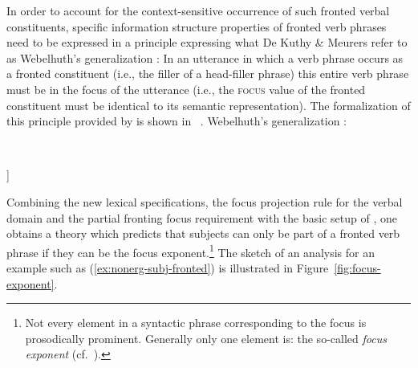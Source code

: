 \documentclass[output=paper
                ,modfonts
                ,nonflat
	        ,collection
	        ,collectionchapter
	        ,collectiontoclongg
 	        ,biblatex
                ,babelshorthands
                ,newtxmath
                ,draftmode
                ,colorlinks, citecolor=brown
]{./langsci/langscibook}
\begin{document}
In order to account for the context-sensitive occurrence of such
fronted verbal constituents, specific information structure properties
of fronted verb phrases need to be expressed in a principle expressing
what De Kuthy \& Meurers refer to as Webelhuth's generalization \citep[53]{Webelhuth90-ohne-crossref}: In
an utterance in which a verb phrase occurs as a fronted constituent
(i.e., the filler of a head-filler phrase) this entire verb phrase
must be in the focus of the utterance (i.e., the \textsc{focus} value
of the fronted constituent must be identical to its semantic
representation).  The formalization of this principle provided by \citep{dKM2003a} is shown in~ .
\ea
\bigskip
Webelhuth's generalization \citep{dKM2003a}:\\
\begin{flushleft}
\begin{avm}
\end{avm}
\impl\ 
\end{flushleft}
\begin{flushright}
\begin{avm}
  [info-struc|focus <@1>\\
  non-head-dtr  [info-struc|focus & <@1>\\
  synsem|loc|cont|lf & @1]]\qquad
\end{avm}\medskip
\label{fig:webelhuths-generalization}
\end{flushright}\unskip
\z
Combining the new lexical specifications, the focus projection rule
for the verbal domain and the partial fronting focus requirement with
the basic setup of \cite{deKuthy2002a}, one obtains a theory which
predicts that subjects can only be part of a fronted verb phrase
if they can be the focus exponent.\footnote{Not every element in a syntactic phrase corresponding to the focus is prosodically prominent. Generally only one element is: the so-called \textit{focus exponent} (cf.\ \citealt{Selkirk95a-u}).} The sketch of an analysis for an
example such as (\ref{ex:nonerg-subj-fronted}) is illustrated in
Figure~\ref{fig:focus-exponent}.
\end{document}
